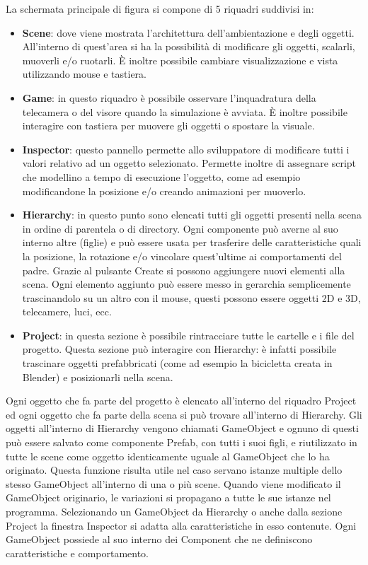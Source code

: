 \noindent La schermata principale di figura  si compone di 5 riquadri suddivisi in:
\begin{itemize}
  \item \textbf{Scene}: dove viene mostrata l'architettura dell'ambientazione e degli oggetti. All'interno di quest'area si ha la possibilità di modificare gli oggetti, scalarli, muoverli e/o ruotarli. È inoltre possibile cambiare visualizzazione e vista utilizzando mouse e tastiera.
 \item \textbf{Game}: in questo riquadro è possibile osservare l'inquadratura della telecamera o del visore quando la simulazione è avviata. È inoltre possibile interagire con tastiera per muovere gli oggetti o spostare la visuale.
  \item \textbf{Inspector}: questo pannello permette allo sviluppatore di modificare tutti i valori relativo ad un oggetto selezionato. Permette inoltre di assegnare script che modellino a tempo di esecuzione l'oggetto, come ad esempio modificandone la posizione e/o creando animazioni per muoverlo. 
  \item \textbf{Hierarchy}: in questo punto sono elencati tutti gli oggetti presenti nella scena in ordine di parentela o di directory. Ogni componente può averne al suo interno altre (figlie) e può essere usata per trasferire delle caratteristiche quali la posizione, la rotazione e/o vincolare quest'ultime ai comportamenti del padre. Grazie al pulsante Create si possono aggiungere nuovi elementi alla scena. Ogni elemento aggiunto può essere messo in gerarchia semplicemente trascinandolo su un altro con il mouse, questi possono essere oggetti 2D e 3D, telecamere, luci, ecc.
    \item \textbf{Project}: in questa sezione è possibile rintracciare tutte le cartelle e i file del progetto. Questa sezione può interagire con Hierarchy: è infatti possibile trascinare oggetti prefabbricati (come ad esempio la bicicletta creata in Blender) e posizionarli nella scena.
\end{itemize}
Ogni oggetto che fa parte del progetto è elencato all’interno del riquadro Project ed ogni oggetto che fa parte della scena si può trovare all’interno di Hierarchy. Gli oggetti all’interno di Hierarchy vengono chiamati GameObject e ognuno di questi può essere salvato come componente Prefab, con tutti i suoi figli, e riutilizzato in tutte le scene come oggetto identicamente uguale al GameObject che lo ha originato. Questa funzione risulta utile nel caso servano istanze multiple dello stesso GameObject all’interno di una o più scene. Quando viene modificato il GameObject originario, le variazioni si propagano a tutte le sue istanze nel programma. Selezionando un GameObject da Hierarchy o anche dalla sezione Project la finestra Inspector si adatta alla caratteristiche in esso contenute. Ogni GameObject possiede al suo interno dei Component che ne definiscono caratteristiche e comportamento.

